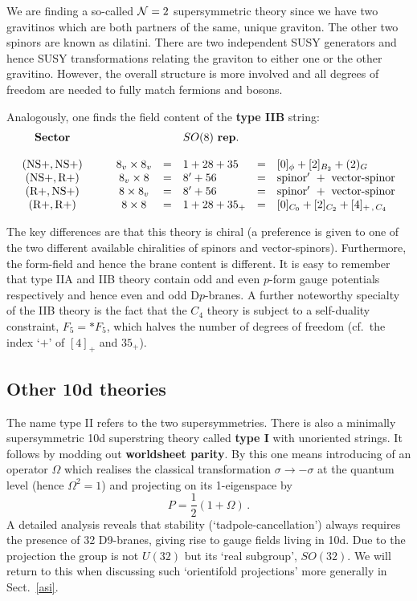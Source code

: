\documentclass[12pt]{article}
\newcommand{\be}{\begin{equation}}
\newcommand{\ee}{\end{equation}}
\numberwithin{equation}{section}
\begin{document}
We are finding a so-called ${\cal N}=2$ supersymmetric theory since we have two gravitinos which are both partners of the same, unique graviton. The other two spinors are known as dilatini. There are two independent SUSY generators and hence SUSY transformations relating the graviton to either one or the other gravitino. However, the overall structure is more involved and all degrees of freedom are needed to fully match fermions and bosons.

Analogously, one finds the field content of the {\bf type IIB} string:
\be
\begin{array}{ccclcl}
{\bf Sector} &&& SO(8)\,\,{\bf rep.} &&
\\
\\
{\rm (NS+,NS+)} & \qquad 8_v\times 8_v &=& 1+28+35 &=& [0]_\phi+[2]_{B_2}+(2)_G
\\
{\rm (NS+,R+)} & \qquad 8_v\times 8 &=& 8'+56 &=& {\rm spinor}'\,\,+\,\,{\rm vector\mbox{-}spinor}
\\
{\rm (R+,NS+)} & \qquad 8\times 8_v &=&  8'+56 &=& {\rm spinor}'\,\,+\,\,{\rm vector\mbox{-}spinor}
\\
{\rm (R+,R+)} & \qquad 8\times 8 &=& 1+28+35_+ &=& [0]_{C_0}+[2]_{C_2}+[4]_{+\,,\,C_4}
\end{array}\nonumber
\ee

The key differences are that this theory is chiral (a preference is given to one of the two different available chiralities of spinors and vector-spinors). Furthermore, the form-field and hence the brane content is different. It is easy to remember that type IIA and IIB theory contain odd and even $p$-form gauge potentials respectively and hence even and odd D$p$-branes. A further noteworthy specialty of the IIB theory is the fact that the $C_4$ theory is subject to a self-duality  constraint, $F_5=* F_5$, which halves the number of degrees of freedom (cf.~the index `$+$' of $[4]_+$ and $35_+$). 







\subsection{Other 10d theories}

The name type II refers to the two supersymmetries. There is also a minimally supersymmetric 10d superstring theory called {\bf type I} with unoriented strings. It follows by modding out {\bf worldsheet parity}. By this one means introducing of an operator $\Omega$ which realises the classical transformation $\sigma\to -\sigma$ at the quantum level (hence $\Omega^2=1$) and projecting on its 1-eigenspace by 
\be
P=\frac{1}{2}(1+\Omega)\,.
\ee
A detailed analysis reveals that stability (`tadpole-cancellation') always requires the presence of 32 D9-branes, giving rise to gauge fields living in 10d. Due to the projection the group is not $U(32)$ but its `real subgroup', $SO(32)$. We will return to this when discussing such `orientifold projections' more generally in Sect.~\ref{asi}.
\end{document}
